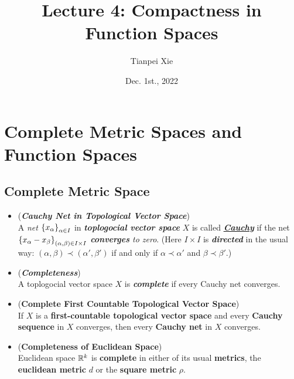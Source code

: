 \documentclass[11pt]{article}
\begin{document}
\title{Lecture 4: Compactness in Function Spaces}
\author{ Tianpei Xie}
\date{Dec. 1st., 2022 }
\maketitle
\tableofcontents
\newpage
\section{Complete Metric Spaces and Function Spaces}
\subsection{Complete Metric Space}
\begin{itemize}
\item \begin{definition} (\emph{\textbf{Cauchy Net in Topological Vector Space}})\\
A \emph{net}  $\left\{x_\alpha\right\}_{\alpha \in I}$ in \emph{\textbf{toplogocial vector space}} $X$ is called \underline{\emph{\textbf{Cauchy}}} if the net $\left\{x_{\alpha} - x_{\beta}\right\}_{(\alpha, \beta) \in I \times I}$
\emph{\textbf{converges} to zero}. (Here $I \times I$ is \emph{\textbf{directed}} in the usual way: $(\alpha, \beta) \prec (\alpha', \beta')$ if and only if $\alpha \prec \alpha'$ and $\beta \prec \beta'$.) 
\end{definition}

\item \begin{definition} (\emph{\textbf{Completeness}})\\
A toplogocial vector space $X$ is \emph{\textbf{complete}} if every Cauchy net converges.
\end{definition}

\item \begin{proposition} (\textbf{Complete First Countable Topological Vector Space})\\
If $X$ is a \textbf{first-countable topological vector space} and every \textbf{Cauchy sequence} in $X$ converges, then every \textbf{Cauchy net} in $X$ converges.
\end{proposition}

\item \begin{proposition} (\textbf{Completeness of Euclidean Space}) \citep{munkres2000topology} \\
Euclidean space ${\mathbb R}^k$ is \textbf{complete} in either of its usual \textbf{metrics}, the \textbf{euclidean metric} $d$ or the \textbf{square metric} $\rho$.
\end{proposition}


\end{itemize}
\end{document}
